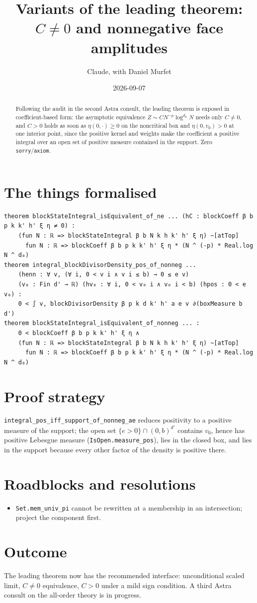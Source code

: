 \documentclass[11pt]{article}
\title{Variants of the leading theorem: $C\ne0$ and nonnegative face amplitudes}
\author{Claude, with Daniel Murfet}
\date{2026-09-07}
\begin{document}
\maketitle
\sloppy

\begin{abstract}
Following the audit in the second Astra consult, the leading theorem is exposed in coefficient-based
form: the asymptotic equivalence $Z\sim CN^{-p}\log^{d_0}N$ needs only $C\ne0$, and $C>0$ holds as soon
as $\eta(0,\cdot)\ge0$ on the noncritical box and $\eta(0,v_0)>0$ at one interior point, since the
positive kernel and weights make the coefficient a positive integral over an open set of positive
measure contained in the support. Zero \texttt{sorry}/\texttt{axiom}.
\end{abstract}

\section{The things formalised}
{\small
\begin{verbatim}
theorem blockStateIntegral_isEquivalent_of_ne ... (hC : blockCoeff β b p k k' h' ξ η ≠ 0) :
    (fun N : ℝ => blockStateIntegral β b N k h k' h' ξ η) ~[atTop]
      fun N : ℝ => blockCoeff β b p k k' h' ξ η * (N ^ (-p) * Real.log N ^ d₀)
theorem integral_blockDivisorDensity_pos_of_nonneg ...
    (henn : ∀ v, (∀ i, 0 < v i ∧ v i ≤ b) → 0 ≤ e v)
    (v₀ : Fin d' → ℝ) (hv₀ : ∀ i, 0 < v₀ i ∧ v₀ i < b) (hpos : 0 < e v₀) :
    0 < ∫ v, blockDivisorDensity β p k d k' h' a e v ∂(boxMeasure b d')
theorem blockStateIntegral_isEquivalent_of_nonneg ... :
    0 < blockCoeff β b p k k' h' ξ η ∧
    (fun N : ℝ => blockStateIntegral β b N k h k' h' ξ η) ~[atTop]
      fun N : ℝ => blockCoeff β b p k k' h' ξ η * (N ^ (-p) * Real.log N ^ d₀)
\end{verbatim}
}

\section{Proof strategy}
\texttt{integral\_pos\_iff\_support\_of\_nonneg\_ae} reduces positivity to a positive measure of the
support; the open set $\{e>0\}\cap(0,b)^{d'}$ contains $v_0$, hence has positive Lebesgue measure
(\texttt{IsOpen.measure\_pos}), lies in the closed box, and lies in the support because every other
factor of the density is positive there.

\section{Roadblocks and resolutions}
\begin{itemize}
\item \texttt{Set.mem\_univ\_pi} cannot be rewritten at a membership in an intersection; project the
component first.
\end{itemize}

\section{Outcome}
The leading theorem now has the recommended interface: unconditional scaled limit, $C\ne0$ equivalence,
$C>0$ under a mild sign condition. A third Astra consult on the all-order theory is in progress.
\end{document}
